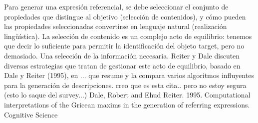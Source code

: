 Para generar una expresi\'on referencial, se debe seleccionar el
conjunto de propiedades que distingue al objetivo (selecci\'on de contenidos), y c\'omo pueden las propiedades seleccionadas
convertirse en lenguaje natural (realizaci\'on ling\"u\'istica). La selecci\'on de contenido es un
complejo acto de equilibrio: tenemos que decir lo suficiente para permitir la identificaci\'on del objeto target, pero no demasiado. Una selecci\'on de la informaci\'on necesaria. Reiter y Dale discuten diversas estrategias que tratan de gestionar este
acto de equilibrio, basado en Dale y Reiter (1995), en ... que resume
y la compara varios algoritmos influyentes para la generaci\'on de descripciones.
creo que es esta cita.. pero no estoy segura (esto lo saque del survey...)
Dale, Robert and Ehud Reiter. 1995.
Computational interpretations of the
Gricean maxims in the generation of
referring expressions.
Cognitive Science

